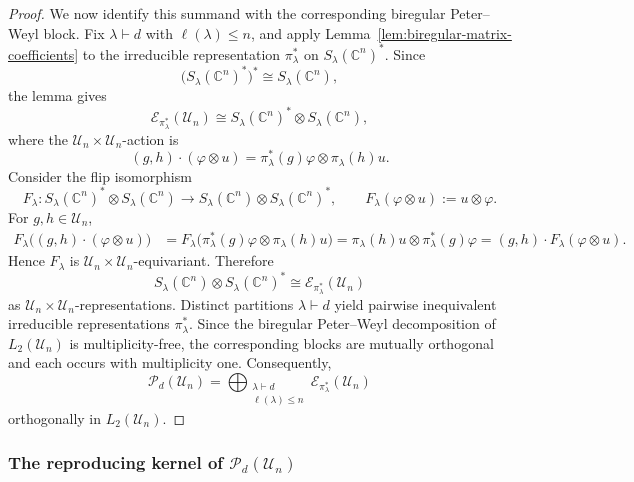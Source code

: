 \documentclass[11pt,showkeys]{amsart}
\begin{document}
\begin{proof}
We now identify this summand with the corresponding biregular
Peter--Weyl block. Fix
\(\lambda\vdash d\) with \(\ell(\lambda)\le n\), and apply
Lemma~\ref{lem:biregular-matrix-coefficients} to the irreducible
representation
\(
    \pi_\lambda^*
\)
on \(S_\lambda(\mathbb C^n)^*\). Since
\[
    \bigl(S_\lambda(\mathbb C^n)^*\bigr)^*
    \cong
    S_\lambda(\mathbb C^n),
\]
the lemma gives
\[
    \mathcal E_{\pi_\lambda^*}(\mathcal U_n)
    \cong
    S_\lambda(\mathbb C^n)^*
    \otimes
    S_\lambda(\mathbb C^n),
\]
where the \(\mathcal U_n\times\mathcal U_n\)-action is
\[
    (g,h)\cdot(\varphi\otimes u)
    =
    \pi_\lambda^*(g)\varphi
    \otimes
    \pi_\lambda(h)u.
\]
Consider the flip isomorphism
\[
    F_\lambda:
    S_\lambda(\mathbb C^n)^*
    \otimes
    S_\lambda(\mathbb C^n)
    \longrightarrow
    S_\lambda(\mathbb C^n)
    \otimes
    S_\lambda(\mathbb C^n)^*,
    \qquad
    F_\lambda(\varphi\otimes u)
    :=
    u\otimes\varphi.
\]
For \(g,h\in\mathcal U_n\),
\[
\begin{aligned}
    F_\lambda\bigl(
        (g,h)\cdot(\varphi\otimes u)
    \bigr)
    &=
    F_\lambda\bigl(
        \pi_\lambda^*(g)\varphi
        \otimes
        \pi_\lambda(h)u
    \bigr) =
    \pi_\lambda(h)u
    \otimes
    \pi_\lambda^*(g)\varphi 
    =
    (g,h)\cdot F_\lambda(\varphi\otimes u).
\end{aligned}
\]
Hence \(F_\lambda\) is
\(\mathcal U_n\times\mathcal U_n\)-equivariant. Therefore
\[
    S_\lambda(\mathbb C^n)
    \otimes
    S_\lambda(\mathbb C^n)^*
    \cong
    \mathcal E_{\pi_\lambda^*}(\mathcal U_n)
\]
as \(\mathcal U_n\times\mathcal U_n\)-representations.
Distinct partitions \(\lambda\vdash d\) yield pairwise inequivalent
irreducible representations \(\pi_\lambda^*\). Since the biregular
Peter--Weyl decomposition of \(L_2(\mathcal U_n)\) is
multiplicity-free, the corresponding blocks are mutually orthogonal
and each occurs with multiplicity one. Consequently,
\[
    \mathcal P_d(\mathcal U_n)
    =
    \bigoplus_{\substack{\lambda\vdash d\\ \ell(\lambda)\le n}}
    \mathcal E_{\pi_\lambda^*}(\mathcal U_n)
\]
orthogonally in \(L_2(\mathcal U_n)\).
\end{proof}





\subsubsection{The reproducing kernel of
\(\mathcal P_d(\mathcal U_n)\)}
\label{sec:unitary-reproducing-kernel}
\end{document}
